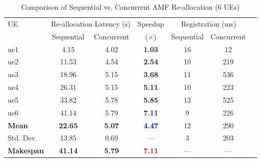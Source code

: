 \begin{table}[ht]
\centering
\caption{Comparison of Sequential vs. Concurrent AMF Re-allocation (6 UEs)}
\label{tab:comparison}
\begin{tabular}{|l|c|c|c|c|c|c|}
\hline
UE & \multicolumn{2}{c|}{Re-allocation Latency (s)} & Speedup & \multicolumn{2}{c|}{Registration (ms)} \\
     & Sequential & Concurrent & ($\times$) & Sequential & Concurrent \\
\hline
ue1 & 4.15 & 4.02 & \textbf{1.03} & 16 & 12 \\
ue2 & 11.53 & 4.54 & \textbf{2.54} & 10 & 219 \\
ue3 & 18.96 & 5.15 & \textbf{3.68} & 11 & 536 \\
ue4 & 26.31 & 5.15 & \textbf{5.11} & 10 & 223 \\
ue5 & 33.82 & 5.78 & \textbf{5.85} & 13 & 525 \\
ue6 & 41.14 & 5.79 & \textbf{7.11} & 9 & 226 \\
\hline
\textbf{Mean} & \textbf{22.65} & \textbf{5.07} & \textbf{\textcolor{blue}{4.47}} & 12 & 290 \\
Std. Dev. & 13.85 & 0.69 & — & 3 & 203 \\
\textbf{Makespan} & \textbf{41.14} & \textbf{5.79} & \textbf{\textcolor{red}{7.11}} & — & — \\
\hline
\end{tabular}
\end{table}
